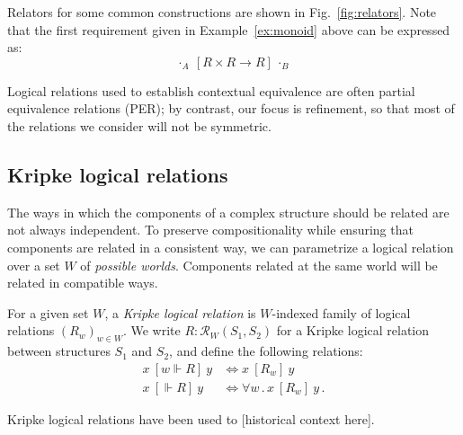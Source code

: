 \documentclass[acmsmall,timestamp,review]{acmart}
\newcommand{\ifr}[1]{\ [{#1}]\ }
\begin{document}
Relators for some common constructions are shown in Fig.~\ref{fig:relators}.
Note that the first requirement given in Example~\ref{ex:monoid} above
can be expressed as:
\[
  \cdot_A \ifr{R \times R \rightarrow R} \cdot_B
\]

Logical relations used to establish contextual equivalence
are often partial equivalence relations (PER);
by contrast, our focus is refinement,
so that most of the relations we consider will not be symmetric.

\subsection{Kripke logical relations}
\label{sec:klr}

The ways in which the components of a complex structure should be related
are not always independent.
To preserve compositionality while ensuring that
components are related in a consistent way,
we can parametrize a logical relation
over a set $W$ of \emph{possible worlds}.
Components related at the same world will be related
in compatible ways.

\begin{definition}
For a given set $W$,
a \emph{Kripke logical relation} is
$W$-indexed family of logical relations $(R_w)_{w \in W}$.
We write $R : \mathcal{R}_W(S_1, S_2)$
for a Kripke logical relation between structures $S_1$ and $S_2$,
and define the following relations:
\begin{align*}
  x \ifr{w \Vdash R} y &\Leftrightarrow x \ifr{R_w} y \\
  x \ifr{\Vdash R} y &\Leftrightarrow \forall w \,.\, x \ifr{R_w} y \,.
\end{align*}
\end{definition}

Kripke logical relations have been used to
[historical context here].
\end{document}
